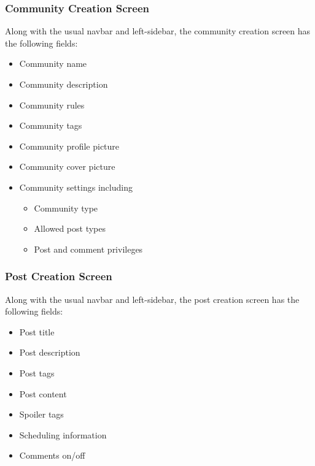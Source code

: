 \documentclass[conference,compsoc]{IEEEtran}
\begin{document}
\subsubsection{Community Creation Screen}
\vspace{0.2cm}
Along with the usual navbar and left-sidebar, the community creation screen has the following fields:
\begin{itemize}
    \item Community name
    \item Community description
    \item Community rules
    \item Community tags
    \item Community profile picture
    \item Community cover picture
    \item Community settings including
          \begin{itemize}
              \item Community type
              \item Allowed post types
              \item Post and comment privileges
          \end{itemize}
\end{itemize}

\subsubsection{Post Creation Screen}
\vspace{0.2cm}
Along with the usual navbar and left-sidebar, the post creation screen has the following fields:
\begin{itemize}
    \item Post title
    \item Post description
    \item Post tags
    \item Post content
    \item Spoiler tags
    \item Scheduling information
    \item Comments on/off
\end{itemize}
\end{document}
